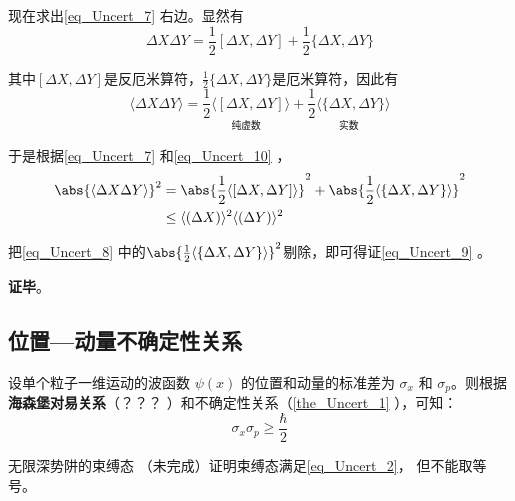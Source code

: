 现在求出\autoref{eq_Uncert_7} 右边。显然有
\begin{equation}
\Delta X \Delta Y = \frac{1}{2}[\Delta X, \Delta Y]+\frac{1}{2}\{\Delta X, \Delta Y\}
\end{equation}

其中$[\Delta X, \Delta Y]$是反厄米算符，$\frac{1}{2}\{\Delta X, \Delta Y\}$是厄米算符，因此有
\begin{equation}\label{eq_Uncert_10}
\langle\Delta X \Delta Y\rangle = \underset{\text{纯虚数}}{\frac{1}{2}\langle[\Delta X, \Delta Y]\rangle} + \underset{\text{实数}}{\frac{1}{2}\langle\{\Delta X, \Delta Y\}\rangle}
\end{equation}

于是根据\autoref{eq_Uncert_7} 和\autoref{eq_Uncert_10} ，
\begin{equation}\label{eq_Uncert_8}
\begin{aligned}
\abs{\langle\Delta X \Delta Y\rangle}^2 &= \abs{\frac{1}{2}\langle[\Delta X, \Delta Y]\rangle}^2+\abs{\frac{1}{2}\langle\{\Delta X, \Delta Y\}\rangle}^2\\
&\leq\langle (\Delta X)\rangle^2\langle (\Delta Y)\rangle^2
\end{aligned}
\end{equation}

把\autoref{eq_Uncert_8} 中的$\abs{\frac{1}{2}\langle\{\Delta X, \Delta Y\}\rangle}^2$剔除，即可得证\autoref{eq_Uncert_9} 。

\textbf{证毕}。






\subsection{位置—动量不确定性关系}
设单个粒子一维运动的波函数 $\psi(x)$ 的位置和动量的标准差为 $\sigma_x$ 和 $\sigma_p$。则根据\textbf{海森堡对易关系}（？？？
）和不确定性关系（\autoref{the_Uncert_1} ），可知：
\begin{equation}\label{eq_Uncert_2}
\sigma_x \sigma_p \geqslant \frac{\hbar}{2}
\end{equation}

\begin{example}{无限深势阱的束缚态}\label{ex_Uncert_2}
（未完成）证明束缚态满足\autoref{eq_Uncert_2}， 但不能取等号。
\end{example}

